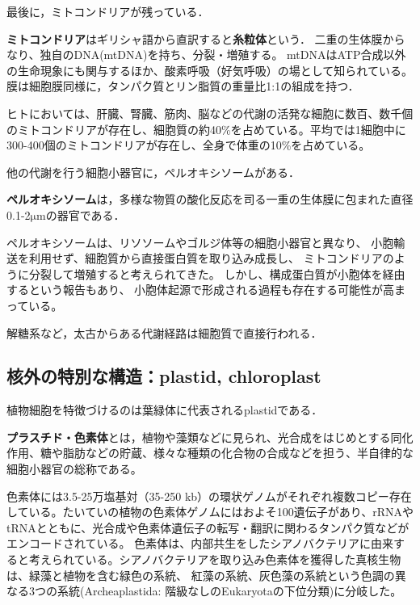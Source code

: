\documentclass[uplatex, dvipdfmx]{jsreport}
\begin{document}
最後に，ミトコンドリアが残っている．

\begin{definition}[mitochondrion]
    \textbf{ミトコンドリア}はギリシャ語から直訳すると\textbf{糸粒体}という．
    二重の生体膜からなり、独自のDNA(mtDNA)を持ち、分裂・増殖する。
    mtDNAはATP合成以外の生命現象にも関与するほか、酸素呼吸（好気呼吸）の場として知られている。
    膜は細胞膜同様に，タンパク質とリン脂質の重量比1:1の組成を持つ．
\end{definition}
\begin{remark}
    ヒトにおいては、肝臓、腎臓、筋肉、脳などの代謝の活発な細胞に数百、数千個のミトコンドリアが存在し、細胞質の約40\%を占めている。平均では1細胞中に300-400個のミトコンドリアが存在し、全身で体重の10\%を占めている。
\end{remark}

他の代謝を行う細胞小器官に，ペルオキシソームがある．

\begin{definition}[peroxisome]
    \textbf{ペルオキシソーム}は，多様な物質の酸化反応を司る一重の生体膜に包まれた直径0.1-2\;$\mathrm{\mu m}$の器官である．

    ペルオキシソームは、リソソームやゴルジ体等の細胞小器官と異なり、
    小胞輸送を利用せず、細胞質から直接蛋白質を取り込み成長し、
    ミトコンドリアのように分裂して増殖すると考えられてきた。
    しかし、構成蛋白質が小胞体を経由するという報告もあり、
    小胞体起源で形成される過程も存在する可能性が高まっている。
\end{definition}

解糖系など，太古からある代謝経路は細胞質で直接行われる．

\subsection{核外の特別な構造：plastid, chloroplast}

植物細胞を特徴づけるのは葉緑体に代表されるplastidである．
\begin{definition}[plastid]
    \textbf{プラスチド・色素体}とは，植物や藻類などに見られ、光合成をはじめとする同化作用、糖や脂肪などの貯蔵、様々な種類の化合物の合成などを担う、半自律的な細胞小器官の総称である。

    色素体には3.5-25万塩基対（35-250 kb）の環状ゲノムがそれぞれ複数コピー存在している。たいていの植物の色素体ゲノムにはおよそ100遺伝子があり、rRNAやtRNAとともに、光合成や色素体遺伝子の転写・翻訳に関わるタンパク質などがエンコードされている。
    色素体は、内部共生をしたシアノバクテリアに由来すると考えられている。シアノバクテリアを取り込み色素体を獲得した真核生物は、緑藻と植物を含む緑色の系統、
    紅藻の系統、灰色藻の系統という色調の異なる3つの系統(Archeaplastida: 階級なしのEukaryotaの下位分類)に分岐した。
\end{definition}
\end{document}
